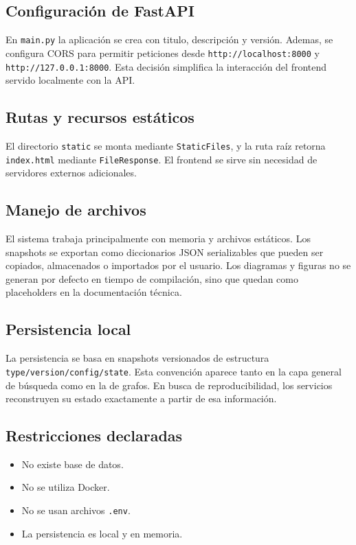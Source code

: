 \documentclass[12pt,onecolumn]{IEEEtran}
\begin{document}
\subsection{Configuración de FastAPI}
En \texttt{main.py} la aplicación se crea con titulo, descripción y versión. Ademas, se configura CORS para permitir peticiones desde \texttt{http://localhost:8000} y \texttt{http://127.0.0.1:8000}. Esta decisión simplifica la interacción del frontend servido localmente con la API.

\subsection{Rutas y recursos estáticos}
El directorio \texttt{static} se monta mediante \texttt{StaticFiles}, y la ruta raíz retorna \texttt{index.html} mediante \texttt{FileResponse}. El frontend se sirve sin necesidad de servidores externos adicionales.

\subsection{Manejo de archivos}
El sistema trabaja principalmente con memoria y archivos estáticos. Los snapshots se exportan como diccionarios JSON serializables que pueden ser copiados, almacenados o importados por el usuario. Los diagramas y figuras no se generan por defecto en tiempo de compilación, sino que quedan como placeholders en la documentación técnica.

\subsection{Persistencia local}
La persistencia se basa en snapshots versionados de estructura \texttt{type/version/config/state}. Esta convención aparece tanto en la capa general de búsqueda como en la de grafos. En busca de reproducibilidad, los servicios reconstruyen su estado exactamente a partir de esa información.

\subsection{Restricciones declaradas}
\begin{itemize}
  \item No existe base de datos.
  \item No se utiliza Docker.
  \item No se usan archivos \texttt{.env}.
  \item La persistencia es local y en memoria.
\end{itemize}
\end{document}
